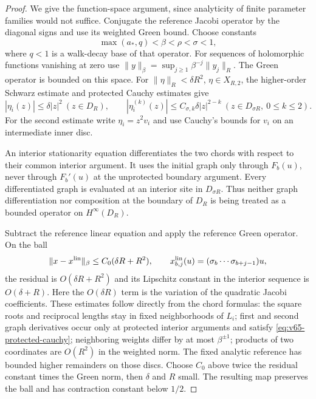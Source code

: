 \begin{proof}
We give the function-space argument, since analyticity of finite
parameter families would not suffice.  Conjugate the reference Jacobi
operator by the diagonal signs and use its weighted Green bound.
Choose constants
\[
 \max(a_*,q)<\beta<\rho<\sigma<1,
\]
where $q<1$ is a walk-decay base of that operator.  For sequences of
holomorphic functions vanishing at zero use
$\|y\|_\beta=\sup_{j\ge1}\beta^{-j}\|y_j\|_R$.
The Green operator is bounded on this space.  For
$\|\eta\|_R<\delta R^2$, $\eta\in X_{R,2}$, the higher-order
Schwarz estimate and protected Cauchy estimates give
\begin{equation}\label{eq:v65-protected-cauchy}
 |\eta_i(z)|\le\delta|z|^2\ (z\in D_R),\qquad
 |\eta_i^{(k)}(z)|\le C_{\sigma,k}\delta|z|^{2-k}
                  \ (z\in D_{\sigma R},\ 0\le k\le2).
\end{equation}
For the second estimate write $\eta_i=z^2v_i$ and use Cauchy's
bounds for $v_i$ on an intermediate inner disc.

An interior stationarity equation differentiates the two chords with
respect to their common interior argument.  It uses the initial graph
only through $F_b(u)$, never through $F_b'(u)$ at the unprotected
boundary argument.  Every differentiated graph is evaluated at an
interior site in $D_{\sigma R}$.  Thus neither graph differentiation
nor composition at the boundary of $D_R$ is being treated as a bounded
operator on $H^\infty(D_R)$.

Subtract the reference linear equation and apply the reference Green
operator.  On the ball
\[
 \|x-x^{\rm lin}\|_\beta\le C_0(\delta R+R^2),\qquad
 x^{\rm lin}_{b,j}(u)=(\sigma_b\cdots\sigma_{b+j-1})u,
\]
the residual is $O(\delta R+R^2)$ and its Lipschitz constant in the
interior sequence is $O(\delta+R)$.  Here the $O(\delta R)$ term
is the variation of the quadratic Jacobi coefficients.  These estimates
follow directly from the chord formulas: the square roots and reciprocal
lengths stay in fixed neighborhoods of $L_i$; first and second graph
derivatives occur only at protected interior arguments and satisfy
\eqref{eq:v65-protected-cauchy}; neighboring weights differ by at most
$\beta^{\pm1}$; products of two coordinates are $O(R^2)$ in the
weighted norm.  The fixed analytic reference has bounded higher
remainders on those discs.  Choose $C_0$ above twice the residual
constant times the Green norm, then $\delta$ and $R$ small.  The
resulting map preserves the ball and has contraction constant below
$1/2$.


\end{proof}
